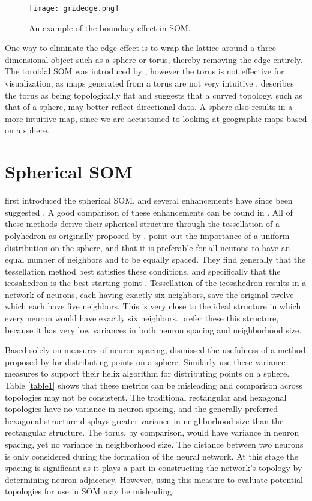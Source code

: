 \begin{figure}[htb]
\centering
\texttt{[image: gridedge.png]}
\caption{An example of the boundary effect in SOM.}
\label{som:states}
\end{figure}

One way to eliminate the edge effect is to wrap the lattice around a
three-dimensional object such as a sphere or torus, thereby removing the edge
entirely. The toroidal SOM was introduced by \cite{li1993}, however the torus
is not effective for visualization, as maps generated from a torus are not
very intuitive \citep{ito2000,wu2006}.  \cite{ritter99} describes the torus as
being topologically flat and suggests that a curved topology, such as that of
a sphere, may better reflect directional data.  A sphere also results in a
more intuitive map, since we are accustomed to looking at geographic maps
based on a sphere.  

\section{Spherical SOM}
\label{bg:sphere}
\cite{ritter99} first introduced the spherical SOM, and several enhancements have
since been suggested \citep{boudjemai2003,sangole03,Nishio:2006fk,wu2006}.  A
good comparison of these enhancements can be found in \cite{wu2006}.  All of
these methods derive their spherical structure through the tessellation of a
polyhedron as originally proposed by \cite{ritter99}.  \cite{wu2006} point
out the importance of a uniform distribution on the sphere, and that it is
preferable for all neurons to have an equal number of neighbors and to be
equally spaced.  They find generally that the tessellation method best satisfies
these conditions, and specifically that the icosahedron is the best starting
point \citep{wu2005}. Tessellation of the icosahedron results in a network of
neurons, each having exactly six neighbors, save the original twelve
which each have five neighbors.  This is very close to the ideal structure in
which every neuron would have exactly six neighbors.  \cite{wu2006} prefer
these this structure, because it has very low variances in both neuron spacing
and neighborhood size. 

Based solely on measures of neuron spacing, \cite{wu2005} dismissed the usefulness of a method
proposed by \cite{Rakhmanov94} for distributing points on a sphere.  Similarly
\cite{Nishio:2006fk} use these variance measures to support their helix
algorithm for distributing points on a sphere.  Table \ref{table1} shows that
these metrics can be misleading and comparison across topologies may not be
consistent.  The traditional rectangular and hexagonal topologies have no
variance in neuron spacing, and the generally preferred hexagonal structure
displays greater variance in neighborhood size than the rectangular structure.
The torus, by comparison, would have variance in neuron spacing, yet no
variance in neighborhood size.  The distance between two neurons is only
considered during the formation of the neural network.  At this stage the
spacing is significant as it plays a part in constructing the network's
topology by determining neuron adjacency.  However, using this measure to
evaluate potential topologies for use in SOM may be misleading.

